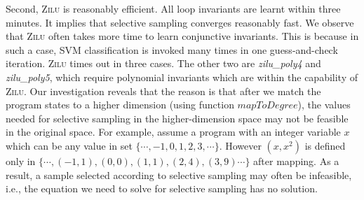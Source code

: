 

Second, \textsc{Zilu} is reasonably efficient. All loop invariants are learnt within three minutes.
It implies that selective sampling converges reasonably fast.
We observe that \textsc{Zilu} often takes more time to learn conjunctive invariants.
This is because in such a case, SVM classification is invoked many times in one guess-and-check iteration. \textsc{Zilu} times out in three cases. 
The other two are \emph{zilu\_poly4} and \emph{zilu\_poly5}, which require polynomial invariants which are within the capability of \textsc{Zilu}.
Our investigation reveals that the reason is that after we match the program states to a higher dimension (using function $\mathit{mapToDegree}$),
the values needed for selective sampling in the higher-dimension space may not be feasible in the original space.
For example, assume a program with an integer variable $\mathit{x}$ which can be any value in set $\mathit{\{\cdots, -1, 0,  1, 2, 3, \cdots\}}$.
However $\mathit{(x, x^2)}$ is defined only in $\mathit{\{\cdots, (-1,1), (0,0), (1,1), (2, 4), (3, 9) \cdots\}}$ after mapping.
As a result, a sample selected according to selective sampling may often be infeasible, i.e., the equation we need to solve for selective sampling has no solution.


